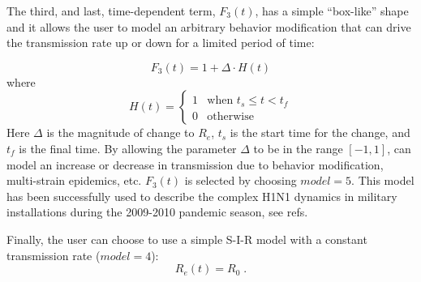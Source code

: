 \documentclass[a4paper]{article}
\begin{document}
The third, and last, time-dependent term, $F_3(t)$, has a simple ``box-like'' shape and it allows the user to model an arbitrary behavior modification that can drive the transmission rate up or down for a limited period of time:

\begin{equation}
  F_3(t) = 1 + \Delta \cdot H(t) \label{eq:f3}
\end{equation}
where
\begin{equation}
H(t) = \left\{ \begin{array}{ll}
1 & \mbox{when $t_s \le t < t_f $} \\
0 & \mbox{otherwise}
 \end{array}
 \right. \label{eq:heavy}
 \end{equation}
Here $\Delta$ is the magnitude of change to $R_e$, $t_s$ is the start time for the change, and $t_f$ is the final time.
By allowing the parameter $\Delta$ to be in the range $[-1,1]$,  can model an increase or decrease in transmission due to behavior modification, multi-strain epidemics, etc.   $F_3(t)$ is selected by choosing $model = 5$. This model has been successfully used to describe the complex H1N1 dynamics in military installations during the 2009-2010 pandemic season, see refs. \cite{riley13a, riley15a}



Finally, the user can choose to use a simple S-I-R model with a constant transmission rate ($model=4$):
\begin{equation}
R_e(t) = R_{0}\;.
\end{equation}
\end{document}
